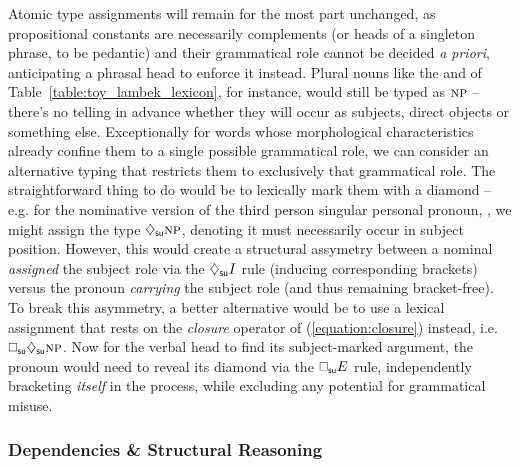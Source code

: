 Atomic type assignments will remain for the most part unchanged, as propositional constants are necessarily complements (or heads of a singleton phrase, to be pedantic) and their grammatical role cannot be decided \textit{a priori}, anticipating a phrasal head to enforce it instead.
Plural nouns like the  and  of Table~\ref{table:toy_lambek_lexicon}, for instance, would still be typed as $\np[s]$ -- there's no telling in advance whether they will occur as subjects, direct objects or something else.
Exceptionally for words whose morphological characteristics already confine them to a single possible grammatical role, we can consider an alternative typing that restricts them to exclusively that grammatical role.
The straightforward thing to do would be to lexically mark them with a diamond -- e.g. for the nominative version of the third person singular personal pronoun, , we might assign the type $\ddia{su}\np[s]$, denoting it must necessarily occur in subject position.
However, this would create a structural assymetry between a nominal \textit{assigned} the subject role via the $\ddia{su} I$ rule (inducing corresponding brackets) versus the pronoun \textit{carrying} the subject role (and thus remaining bracket-free).
To break this asymmetry, a better alternative would be to use a lexical assignment that rests on the \textit{closure} operator of (\ref{equation:closure}) instead, i.e. $\dbox{su}\ddia{su}\np[s]$.
Now for the verbal head to find its subject-marked argument, the pronoun would need to reveal its diamond via the $\dbox{su} E$ rule, independently bracketing \textit{itself} in the process, while excluding any potential for grammatical misuse.

\subsubsection{Dependencies \& Structural Reasoning}
\label{subsubsection:sreason_dep}
